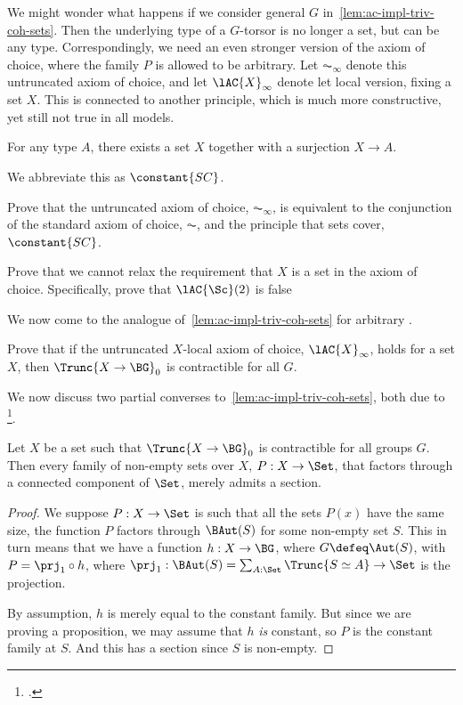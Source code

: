 We might wonder what happens if we consider general \inftygps $G$
in~\cref{lem:ac-impl-triv-coh-sets}.
Then the underlying type of a $G$-torsor is no longer a set, but can be any type.
Correspondingly, we need an even stronger version of the axiom of choice,
where the family $P$ is allowed to be arbitrary.
Let $\AC_\infty$ denote this untruncated axiom of choice,
and let $\lAC{X}_\infty$ denote let local version, fixing a set $X$.
This is connected to another principle, which is much more constructive,
yet still not true in all models.

\begin{principle}\label{pri:sc}
  For any type $A$, there exists a set $X$ together with a surjection $X \to A$.
\end{principle}

We abbreviate this as $\constant{SC}$.

\begin{xca}
  Prove that the untruncated axiom of choice, $\AC_\infty$,
  is equivalent to the conjunction of the standard axiom of choice, $\AC$,
  and the principle that sets cover, $\constant{SC}$.
\end{xca}

\begin{xca}
  Prove that we cannot relax the requirement that $X$ is a set
  in the axiom of choice.
  Specifically, prove that $\lAC{\Sc}(2)$ is false
\end{xca}

We now come to the analogue of~\cref{lem:ac-impl-triv-coh-sets}
for arbitrary \inftygps.

\begin{xca}
  Prove that if the untruncated $X$-local axiom of choice, $\lAC{X}_\infty$,
  holds for a set $X$,
  then $\Trunc{X \to \BG}_0$ is contractible for all \inftygps $G$.
\end{xca}

We now discuss two partial converses to~\cref{lem:ac-impl-triv-coh-sets},
both due to \citeauthor{Blass-Finite-Choice}\footcite{Blass-Finite-Choice}.

\begin{theorem}[Blass]\label{thm:Blass-1}
  Let $X$ be a set such that $\Trunc{X \to \BG}_0$ is contractible
  for all groups $G$.
  Then every family of non-empty sets over $X$, $P : X \to \Set$,
  that factors through a connected component of $\Set$,
  merely admits a section.
\end{theorem}

\begin{proof}
  We suppose $P : X \to \Set$ is such that all the sets $P(x)$
  have the same size, \ie the function $P$ factors through
  $\BAut(S)$ for some non-empty set $S$.
  This in turn means that we have a function $h : X \to \BG$,
  where $G \defeq \Aut(S)$, with $P = \prj_1 \circ h$,
  where $\prj_1 : \BAut(S) = \sum_{A : \Set}\Trunc{S \simeq A} \to \Set$
  is the projection.

  By assumption, $h$ is merely equal to the constant family.
  But since we are proving a proposition, we may assume that $h$
  \emph{is} constant, so $P$ is the constant family at $S$.
  And this has a section since $S$ is non-empty.
\end{proof}

